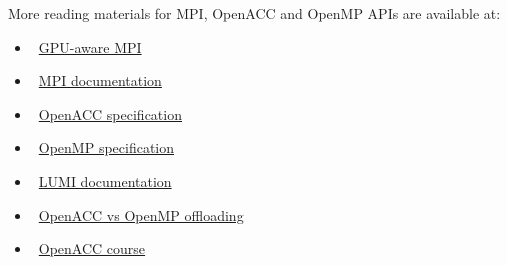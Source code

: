 \par
More reading materials for MPI, OpenACC and OpenMP APIs are available at:
\begin{itemize}
    \item~\href{https://documentation.sigma2.no/code_development/guides/gpuaware_mpi.html}{GPU-aware MPI}
    \item~\href{https://www.mpi-forum.org/docs/mpi-4.0/mpi40-report.pdf}{MPI documentation}
    \item~\href{https://www.openacc.org/sites/default/files/inline-images/Specification/OpenACC-3.2-final.pdf}{OpenACC specification}
    \item~\href{https://www.openmp.org/wp-content/uploads/OpenMP-API-Specification-5-2.pdf}{OpenMP specification}
    \item~\href{https://docs.lumi-supercomputer.eu/development/compiling/prgenv/}{LUMI documentation}
    \item~\href{https://documentation.sigma2.no/code_development/guides/converting_acc2omp/openacc2openmp.html}{OpenACC vs OpenMP offloading}
    \item~\href{https://github.com/HichamAgueny/GPU-course}{OpenACC course}
\end{itemize}

